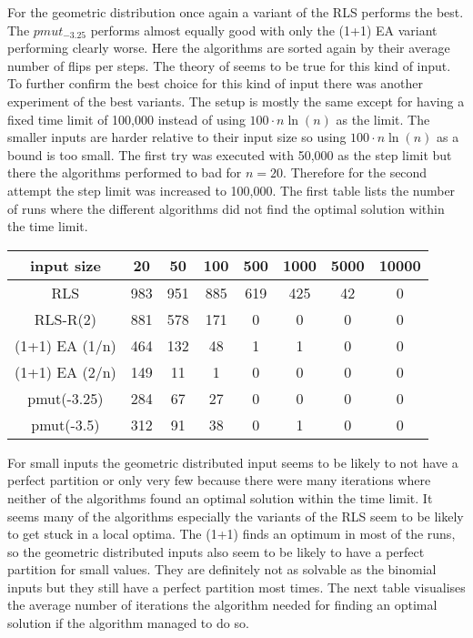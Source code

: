 For the geometric distribution once again a variant of the RLS performs the best.
The $pmut_{-3.25}$ performs almost equally good with only the (1+1) EA variant performing clearly worse.
Here the algorithms are sorted again by their average number of flips per steps. The theory of seems to be true for this kind of input.\newline
To further confirm the best choice for this kind of input there was another experiment of the best variants.
The setup is mostly the same except for having a fixed time limit of 100,000 instead of using $100 \cdot n\ln(n)$ as the limit.
The smaller inputs are harder relative to their input size so using $100 \cdot n\ln(n)$ as a bound is too small.
The first try was executed with 50,000 as the step limit but there the algorithms performed to bad for $n=20$.
Therefore for the second attempt the step limit was increased to 100,000.
The first table lists the number of runs where the different algorithms did not find the optimal solution within the time limit.

\begin{tabular}{cccccccc}

      input size    & 20  & 50  & 100 & 500 & 1000 & 5000 & 10000 \\\hline
      RLS           & 983 & 951 & 885 & 619 & 425  & 42   & 0     \\
      RLS-R(2)      & 881 & 578 & 171 & 0   & 0    & 0    & 0     \\
      (1+1) EA (1/n) & 464 & 132 & 48  & 1   & 1    & 0    & 0     \\
      (1+1) EA (2/n) & 149 & 11  & 1   & 0   & 0    & 0    & 0     \\
      pmut(-3.25)   & 284 & 67  & 27  & 0   & 0    & 0    & 0     \\
      pmut(-3.5)    & 312 & 91  & 38  & 0   & 1    & 0    & 0     \\
\end{tabular}

For small inputs the geometric distributed input seems to be likely to not have a perfect partition or only very few because there were many iterations where neither of the algorithms found an optimal solution within the time limit.
It seems many of the algorithms especially the variants of the RLS seem to be likely to get stuck in a local optima.
The (1+1) finds an optimum in most of the runs, so the geometric distributed inputs also seem to be likely to have a perfect partition for small values.
They are definitely not as solvable as the binomial inputs but they still have a perfect partition most times.
The next table visualises the average number of iterations the algorithm needed for finding an optimal solution if the algorithm managed to do so.

